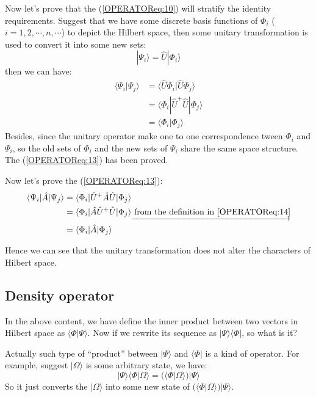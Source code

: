 Now let's prove that the (\ref{OPERATOReq:10}) will stratify the
identity requirements. Suggest that we have some discrete basis
functions of $\Phi_{i}$ ($i = 1, 2, \cdots, n, \cdots$) to depict
the Hilbert space, then some unitary transformation is used to
convert it into some new sets:
\begin{equation}\label{}
|\Psi_{i}\rangle = \hat{U}|\Phi_{i}\rangle
\end{equation}
then we can have:
\begin{align}\label{OPERATOReq:11}
\langle \Psi_{i}|\Psi_{j}\rangle & = \langle
\hat{U}\Phi_{i}|\hat{U}\Phi_{j}\rangle \nonumber \\
&=\langle
\Phi_{i}|\hat{U}^{+}\hat{U}|\Phi_{j}\rangle \nonumber \\
&=\langle \Phi_{i}|\Phi_{j}\rangle
\end{align}
Besides, since the unitary operator make one to one correspondence
tween $\Phi_{i}$ and $\Psi_{i}$, so the old sets of $\Phi_{i}$ and
the new sets of $\Psi_{i}$ share the same space structure. The
(\ref{OPERATOReq:13}) has been proved.

Now let's prove the (\ref{OPERATOReq:13}):
\begin{align}\label{}
\langle\Psi_{i}|\hat{A}|\Psi_{j}\rangle &=
\langle\Phi_{i}|\hat{U}^{+}\hat{A}\hat{U}|\Phi_{j}\rangle \nonumber \\
&=\langle\Phi_{i}|\hat{A}\hat{U}^{+}\hat{U}|\Phi_{j}\rangle
\underrightarrow{
\text{ from the definition in \ref{OPERATOReq:14}}}\nonumber \\
&=\langle\Phi_{i}|\hat{A}|\Phi_{j}\rangle
\end{align}

Hence we can see that the unitary transformation does not alter the
characters of Hilbert space.

\subsection{Density operator}\label{OPERATOR:1}
%
%
%
%
In the above content, we have define the inner product between two
vectors in Hilbert space as $\langle\Phi|\Psi\rangle$. Now if we
rewrite its sequence as $|\Psi\rangle\langle\Phi|$, so what is it?

Actually such type of ``product'' between $|\Psi\rangle$ and
$\langle\Phi|$ is a kind of operator. For example, suggest
$|\Omega\rangle$ is some arbitrary state, we have:
\begin{equation}\label{}
|\Psi\rangle\langle\Phi|\Omega\rangle =
(\langle\Phi|\Omega\rangle)|\Psi\rangle
\end{equation}
So it just converts the $|\Omega\rangle$ into some new state of
$(\langle\Phi|\Omega\rangle)|\Psi\rangle$.

